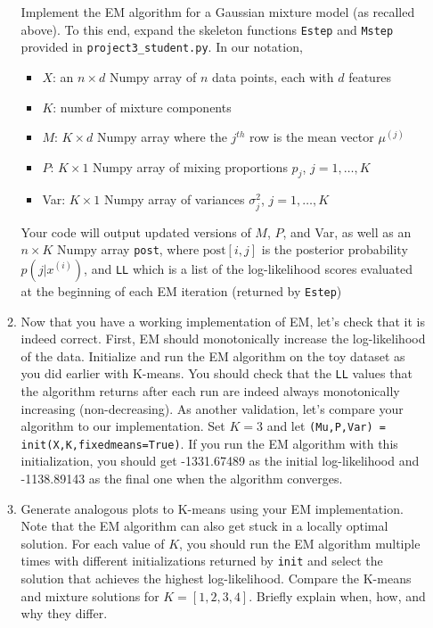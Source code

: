 \begin{enumerate}
\begin{enumerate}
    Implement the EM algorithm for a Gaussian mixture model (as recalled above). To this end, expand the skeleton functions \texttt{Estep} and \texttt{Mstep} provided in \texttt{project3\_student.py}. In our notation, 
    \begin{itemize}
    \item $X$: an $n \times d$ Numpy array of $n$ data points, each with $d$ features
    \item $K$: number of mixture components
    \item $M$: $K \times d$ Numpy array where the $j^{th}$ row is the mean vector $\mu^{(j)}$ 
    \item $P$: $K \times 1$ Numpy array of mixing proportions $p_j$, $j=1,\ldots, K$
    \item Var: $K \times 1$ Numpy array of variances $\sigma_j^2$, $j=1,\ldots,K$
    \end{itemize}
    Your code will output updated versions of $M$, $P$, and Var, as well as an $n \times K$ Numpy array \texttt{post}, where $\text{post}[i,j]$ is the posterior probability $p(j|x^{(i)})$, and \texttt{LL} which is a list of the log-likelihood scores evaluated at the beginning of each EM iteration (returned by \texttt{Estep})

\item Now that you have a working implementation of EM, let's check that it is indeed correct. First, EM should monotonically increase the log-likelihood of the data. Initialize and run the EM algorithm on the toy dataset as you did earlier with K-means. You should check that the \texttt{LL} values that the algorithm returns after each run are indeed always monotonically increasing (non-decreasing). As another validation, let's compare your algorithm to our implementation. Set $K=3$ and let \texttt{(Mu,P,Var) = init(X,K,fixedmeans=True)}. If you run the EM algorithm with this initialization, you should get -1331.67489 as the initial log-likelihood and -1138.89143 as the final one when the algorithm converges.

\item Generate analogous plots to K-means using your EM implementation. Note that the EM algorithm can also get stuck in a locally optimal solution. For each value of $K$, you should run the EM algorithm multiple times with different initializations returned by \texttt{init} and select the solution that achieves the highest log-likelihood. Compare the K-means and mixture solutions for $K=[1,2,3,4]$. Briefly explain when, how, and why they differ. 


\end{enumerate}
\end{enumerate}
